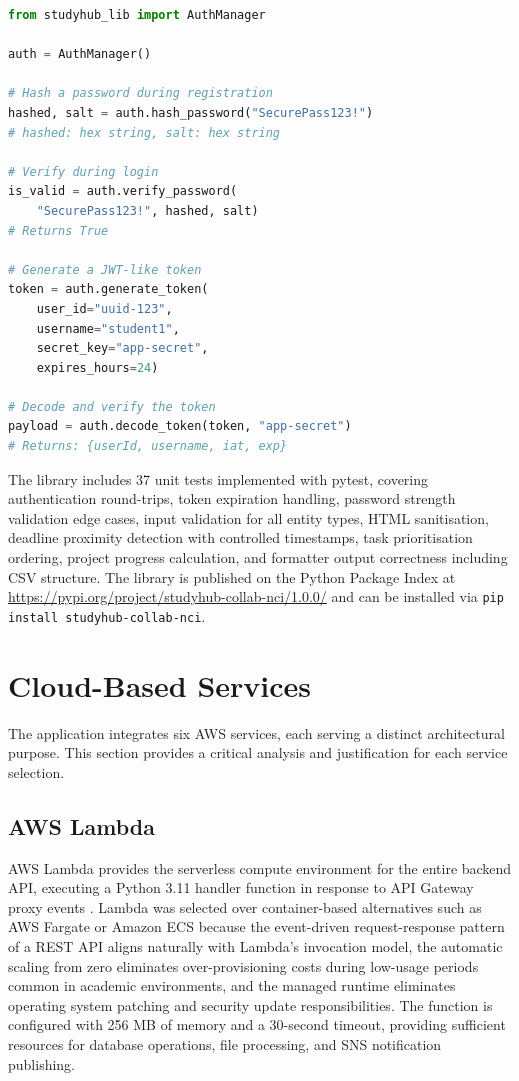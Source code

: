 \documentclass[conference]{IEEEtran}
\begin{document}
\begin{lstlisting}[language=Python, caption={AuthManager usage for password hashing and JWT tokens}]
from studyhub_lib import AuthManager

auth = AuthManager()

# Hash a password during registration
hashed, salt = auth.hash_password("SecurePass123!")
# hashed: hex string, salt: hex string

# Verify during login
is_valid = auth.verify_password(
    "SecurePass123!", hashed, salt)
# Returns True

# Generate a JWT-like token
token = auth.generate_token(
    user_id="uuid-123",
    username="student1",
    secret_key="app-secret",
    expires_hours=24)

# Decode and verify the token
payload = auth.decode_token(token, "app-secret")
# Returns: {userId, username, iat, exp}
\end{lstlisting}

The library includes 37 unit tests implemented with pytest, covering authentication round-trips, token expiration handling, password strength validation edge cases, input validation for all entity types, HTML sanitisation, deadline proximity detection with controlled timestamps, task prioritisation ordering, project progress calculation, and formatter output correctness including CSV structure. The library is published on the Python Package Index at \url{https://pypi.org/project/studyhub-collab-nci/1.0.0/} and can be installed via \texttt{pip install studyhub-collab-nci}.

\section{Cloud-Based Services}

The application integrates six AWS services, each serving a distinct architectural purpose. This section provides a critical analysis and justification for each service selection.

\subsection{AWS Lambda}

AWS Lambda provides the serverless compute environment for the entire backend API, executing a Python 3.11 handler function in response to API Gateway proxy events \cite{awslambda}. Lambda was selected over container-based alternatives such as AWS Fargate or Amazon ECS because the event-driven request-response pattern of a REST API aligns naturally with Lambda's invocation model, the automatic scaling from zero eliminates over-provisioning costs during low-usage periods common in academic environments, and the managed runtime eliminates operating system patching and security update responsibilities. The function is configured with 256 MB of memory and a 30-second timeout, providing sufficient resources for database operations, file processing, and SNS notification publishing.
\end{document}
